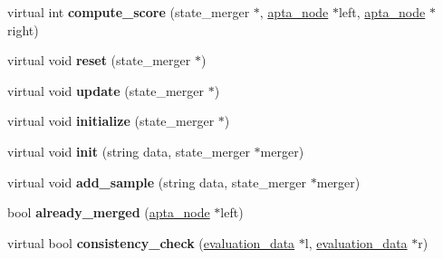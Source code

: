 \begin{DoxyCompactItemize}
\item 
virtual int {\bfseries compute\+\_\+score} (state\+\_\+merger $\ast$, \hyperlink{classapta__node}{apta\+\_\+node} $\ast$left, \hyperlink{classapta__node}{apta\+\_\+node} $\ast$right)\hypertarget{classevaluation__function_a36e533923cde5358ecb74ad40e46f1f9}{}\label{classevaluation__function_a36e533923cde5358ecb74ad40e46f1f9}

\item 
virtual void {\bfseries reset} (state\+\_\+merger $\ast$)\hypertarget{classevaluation__function_acc457754e1aff5d9e20cf51ea8976f37}{}\label{classevaluation__function_acc457754e1aff5d9e20cf51ea8976f37}

\item 
virtual void {\bfseries update} (state\+\_\+merger $\ast$)\hypertarget{classevaluation__function_af2c5134a769ccfd8703608b16a4ede06}{}\label{classevaluation__function_af2c5134a769ccfd8703608b16a4ede06}

\item 
virtual void {\bfseries initialize} (state\+\_\+merger $\ast$)\hypertarget{classevaluation__function_af15dfb9e27651870fbabf8b8355faefc}{}\label{classevaluation__function_af15dfb9e27651870fbabf8b8355faefc}

\item 
virtual void {\bfseries init} (string data, state\+\_\+merger $\ast$merger)\hypertarget{classevaluation__function_aea7c6d5884be03430212d55b3dd546ea}{}\label{classevaluation__function_aea7c6d5884be03430212d55b3dd546ea}

\item 
virtual void {\bfseries add\+\_\+sample} (string data, state\+\_\+merger $\ast$merger)\hypertarget{classevaluation__function_a5b63865df7d337aa0c258b7c795dd6c6}{}\label{classevaluation__function_a5b63865df7d337aa0c258b7c795dd6c6}

\item 
bool {\bfseries already\+\_\+merged} (\hyperlink{classapta__node}{apta\+\_\+node} $\ast$left)\hypertarget{classevaluation__function_a66ed8b822b6cf90b37716edf50314886}{}\label{classevaluation__function_a66ed8b822b6cf90b37716edf50314886}

\item 
virtual bool {\bfseries consistency\+\_\+check} (\hyperlink{classevaluation__data}{evaluation\+\_\+data} $\ast$l, \hyperlink{classevaluation__data}{evaluation\+\_\+data} $\ast$r)\hypertarget{classevaluation__function_aa612bc5d069d73d95ba3b9dc1c617fed}{}\label{classevaluation__function_aa612bc5d069d73d95ba3b9dc1c617fed}


\end{DoxyCompactItemize}
